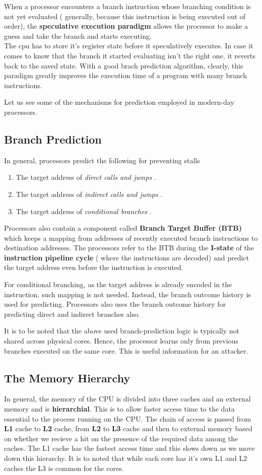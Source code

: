 \documentclass[12pt]{article}
\begin{document}
When a processor encounters a branch instruction whose branching condition is not yet evaluated ( generally, because this instruction is being executed out of order), the \textbf{speculative execution paradigm} allows the processor to make a guess and take the branch and starts executing. \\
The cpu has to store it's register state before it speculatively executes. In case it comes to know that the branch it started evaluating isn't the right one, it reverts back to the saved state. With a good brach prediction algorithm, clearly, this paradigm greatly improves the execution time of a program with many branch instructions. 

Let us see some of the mechanisms for prediction employed in modern-day processors.  

\subsection{Branch Prediction}
In general, processors predict the following for preventing stalls 
\begin{enumerate}
	\item The target address of \textit{ direct calls and jumps }.  
	\item The target address of \textit{ indirect calls and jumps }.
	\item The target address of \textit{ conditional branches }.
\end{enumerate}
Processors also contain a component called \textbf{Branch Target Buffer (BTB) } which keeps a mapping from addresses of recently executed branch instructions to destination addresses. The processors refer to the BTB during the \textbf{I-state} of the \textbf{instruction pipeline cycle} ( where the instructions are decoded) and predict the target address even before the instruction is executed.

For conditional branching, as the target address is already encoded in the instruction, such mapping is not needed. Instead, the branch outcome history is used for predicting. Processors also uses the branch outcome history for predicting direct and indirect branches also. 

It is to be noted that the above used branch-prediction logic is typically not shared across physical cores. Hence, the processor learns only from previous branches executed on the same core. This is useful information for an attacker.
\subsection{The Memory Hierarchy}
In general, the memory of the CPU is divided into three caches and an external memory and is \textbf{hierarchial}. This is to allow faster access time to the data essential to the process running on the CPU. The chain of access is passed from \textbf{L1} cache to \textbf{L2} cache, from \textbf{L2} to \textbf{L3} cache and then to external memory based on whether we recieve a hit on the presence of the required data among the caches. The L1 cache has the fastest  access time and this slows down as we move down this hierarchy. It is to noted that while each core has it's own L1 and L2 caches the L3 is common for the cores.
\end{document}
